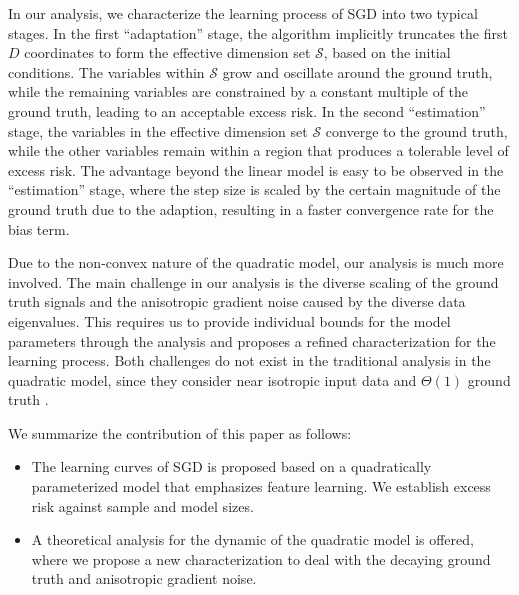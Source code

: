 In our analysis, we characterize the learning process of SGD into two typical stages. 
In the first ``adaptation'' stage, the algorithm implicitly truncates the first $D$ coordinates 
to form the effective dimension set $\mathcal{S}$, based on the initial conditions. 
The variables within $\mathcal{S}$ grow and oscillate around the ground truth, while the remaining variables are constrained by a constant multiple of the ground truth, leading to an acceptable excess risk. 
In the second ``estimation'' stage, the variables in the effective dimension set $\mathcal{S}$ converge to the ground truth, while the other variables remain within a region that produces a tolerable level of excess risk.  The advantage beyond the linear model is easy to be observed in the “estimation” stage, where the step size is scaled by the certain
magnitude of the ground truth due to the adaption, resulting in a faster convergence rate for the bias term. %


Due to the non-convex nature of the quadratic model, our analysis is much more involved. The main challenge in our analysis is the diverse scaling of the ground truth signals and the anisotropic gradient noise caused by the diverse data eigenvalues. This requires us to provide individual bounds for the model parameters through the analysis and proposes a refined characterization for the learning process.
Both challenges do not exist in the traditional analysis in the quadratic model, since they consider near isotropic input data and $\Theta(1)$ ground truth \citep{haochen21shape}. 

\vspace{0.1in}
We summarize the contribution of this paper as follows: \vspace{-0.05in}
\begin{itemize}
    \item The learning curves of SGD is proposed based on a quadratically parameterized model that emphasizes feature learning. We establish excess risk against sample and model sizes.
\vspace{-0.05in}
    \item A theoretical analysis for the dynamic of the quadratic model is offered, where we propose a new characterization to deal with the decaying ground truth and anisotropic gradient noise.
\end{itemize}



